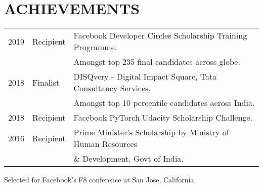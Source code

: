 \documentclass[]{deedy-resume-openfont}
\begin{document}
\begin{minipage}[t]{0.67\textwidth}

\section{ACHIEVEMENTS} 
\begin{tabular}{rll}
2019 & Recipient & Facebook Developer Circles Scholarship Training Programme. \\
     & &  Amongst top 235 final candidates across globe.\\
2018 & Finalist & DISQvery - Digital Impact Square, Tata Consultancy Services.\\
     &  & Amongst top 10 percentile candidates across India.\\
2018 & Recipient & Facebook PyTorch Udacity Scholarship Challenge.\\
2016 & Recipient & Prime Minister's Scholarship by Ministry of Human Resources \\
     & &  \& Development, Govt of India.\\
\end{tabular}
\begin{tightemize}
\item Selected for Facebook’s F8 conference at San Jose, California.\\
\end{tightemize}
\sectionsep

\end{minipage} 
\end{document}
